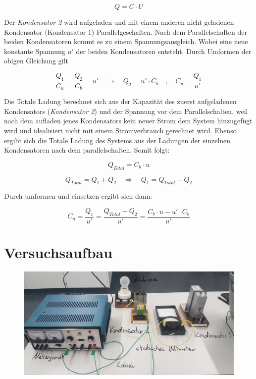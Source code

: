 \documentclass[a4paper,12pt]{article}
\begin{document}
$$Q=C\cdot U$$


Der \textit{Kondensator 2} wird aufgeladen und mit einem anderen nicht geladenen Kondensator (Kondensator 1) Parallelgeschalten. 
Nach dem Parallelschalten der beiden Kondensatoren kommt es zu einem Spannungsausgleich. Wobei eine neue konstante Spannung $u'$ der beiden Kondensatoren entsteht. Durch Umformen der obigen Gleichung gilt

$$\frac{Q_1}{C_u} = \frac{Q_2}{C_b} = u'\quad \Rightarrow \quad Q_2 = u' \cdot C_b \quad , \quad C_u = \frac{Q_1}{u'} $$

Die Totale Ladung berechnet sich aus der Kapazität des zuerst aufgeladenen Kondensators (\textit{Kondensator 2}) und der   Spannung vor dem Parallelschalten, weil nach dem aufladen jenes Kondensators kein neuer Strom dem System hinzugefügt wird und  idealisiert nicht mit einem Stromverbrauch gerechnet wird. Ebenso ergibt sich die Totale Ladung des Systems aus der Ladungen der einzelnen Kondensatoren nach dem parallelschalten. Somit folgt:

$$Q_{Total} = C_b \cdot u$$

$$Q_{Total} = Q_1+Q_2 \quad \Rightarrow \quad Q_1=Q_{Total}-Q_2$$

Durch umformen und einsetzen ergibt sich dann:

$$C_u = \frac{Q_1}{u'} = \frac{Q_{Total}-Q_2}{u'} = \frac{C_b \cdot u - u' \cdot C_b}{u'}$$

\section{Versuchsaufbau}
\begin{figure}[H]

\centering
\includegraphics[width=.8\textwidth]{media/bennenung.png}

\end{figure}
\end{document}
